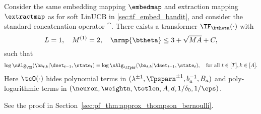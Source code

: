 \begin{theorem}\label{thm:approx_thompson_bernoulli}
Consider the same embedding mapping $\embedmap$ and extraction mapping $\extractmap$ as for soft LinUCB in \ref{sec:tf_embed_bandit},
and consider the standard concatenation operator $\cat$. There exists a  transformer $\TF_\btheta(\cdot)$ with
$$L=1,~~~M^{(1)}=2,~~~ \nrmp{\btheta}\leq 3+\sqrt{ M A}+C,$$
such that
\[
\log \sAlg_{\TS}(\ba_{t,k}|\dset_{t-1},\state_t) = \log \sAlg_{\tfpar}(\ba_{t,k}|\dset_{t-1},\state_t) , ~~~ \text{for all } t\in[T],k\in[A].
\]
Here $\tcO(\cdot)$ hides polynomial terms in $(\lambda^{\pm1},\Tpsparn^{\pm1},b_a^{-1},B_a)$ and poly-logarithmic terms in $(\neuron,\weightn,\totlen,A,d,1/\delta_0,1/\eps)$.
\end{theorem}





See the proof in Section~\ref{sec:pf_thm:approx_thompson_bernoulli}.












